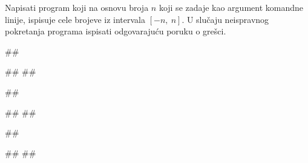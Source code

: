  
\begin{Exercise}[label=p2.6_04] 
 Napisati program koji na osnovu broja $n$ koji se zadaje kao argument komandne 
 linije, ispisuje cele brojeve iz intervala $[-n,\ n]$.
 U slučaju neispravnog pokretanja programa ispisati odgovarajuću poruku o grešci.
 
\begin{minitest}
\begin{upotreba}{1}
##

#\naslovIzlaz#
##
\end{upotreba}
\end{minitest}
\begin{minitest}
\begin{upotreba}{2}
##

#\naslovIzlaz#
##
\end{upotreba}
\end{minitest}
\begin{minitest}
\begin{upotreba}{3}
##

#\naslovIzlaz#
##
\end{upotreba}
\end{minitest}

\end{Exercise}
\ifresenja
\begin{Answer}[ref=p2.6_04]
\sstrana
\end{Answer}
 \fi 
 

